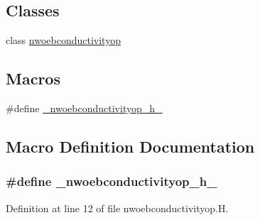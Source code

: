 \subsection*{Classes}
\begin{DoxyCompactItemize}
\item 
class \hyperlink{classnwoebconductivityop}{nwoebconductivityop}
\end{DoxyCompactItemize}
\subsection*{Macros}
\begin{DoxyCompactItemize}
\item 
\#define \hyperlink{nwoebconductivityop_8H_a2af5bc7b8fca5d4e36b7a4a696131e15}{\+\_\+nwoebconductivityop\+\_\+h\+\_\+}
\end{DoxyCompactItemize}


\subsection{Macro Definition Documentation}
\subsubsection[{\texorpdfstring{\+\_\+nwoebconductivityop\+\_\+h\+\_\+}{_nwoebconductivityop_h_}}]{\setlength{\rightskip}{0pt plus 5cm}\#define \+\_\+nwoebconductivityop\+\_\+h\+\_\+}\hypertarget{nwoebconductivityop_8H_a2af5bc7b8fca5d4e36b7a4a696131e15}{}\label{nwoebconductivityop_8H_a2af5bc7b8fca5d4e36b7a4a696131e15}


Definition at line 12 of file nwoebconductivityop.\+H.

